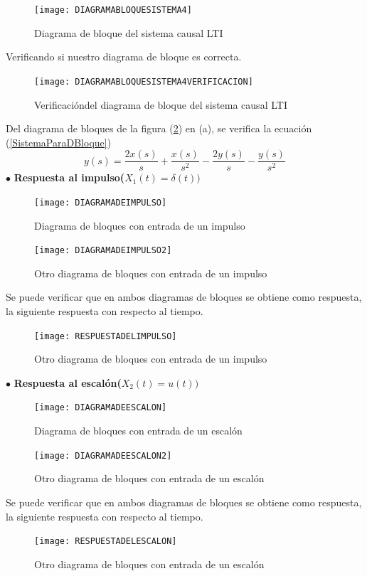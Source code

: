 \documentclass[11pt,a4paper]{article}
\begin{document}
{{\begin{enumerate}
	\begin{figure}[h]
	\centering
	\texttt{[image: DIAGRAMABLOQUESISTEMA4]} 
	\caption{Diagrama de bloque del sistema causal LTI}
\label{DIAGRAMABLOQUESISTEMA4}
\end{figure}
	
	Verificando si nuestro diagrama de bloque es correcta.
	\begin{figure}[h]
	\centering
	\texttt{[image: DIAGRAMABLOQUESISTEMA4VERIFICACION]} 
	\caption{Verificacióndel diagrama de bloque del sistema causal LTI}
\label{DIAGRAMABLOQUESISTEMA4VERIFICACION}
\end{figure}
	Del diagrama de bloques de la figura (\ref{DIAGRAMABLOQUESISTEMA4VERIFICACION})
en (a), se verifica la ecuación (\ref{SistemaParaDBloque})\\
	$$y(s)= \dfrac{2x(s)}{s}+ \dfrac{x(s)}{s^2}- \dfrac{2y(s)}{s}- \dfrac{y(s)}{s^2}$$
	\newpage
 	$\bullet$ \textbf{Respuesta al impulso($X_1(t)=\delta (t))$}\\
	
	\begin{figure}[h]
	\centering
	\texttt{[image: DIAGRAMADEIMPULSO]} 
	\caption{Diagrama de bloques con entrada de un impulso}
\label{DIAGRAMADEIMPULSO}
\end{figure}
\begin{figure}[h]
	\centering
	\texttt{[image: DIAGRAMADEIMPULSO2]} 
	\caption{Otro diagrama de bloques con entrada de un impulso}
\label{DIAGRAMADEIMPULSO2}
\end{figure}
	Se puede verificar que en ambos diagramas de bloques se obtiene como respuesta, la siguiente respuesta con respecto al tiempo.
	\begin{figure}[h]
	\centering
	\texttt{[image: RESPUESTADELIMPULSO]} 
	\caption{Otro diagrama de bloques con entrada de un impulso}
\label{RESPUESTADELIMPULSO}
\end{figure}
	\newpage
	
	$\bullet$ \textbf{Respuesta al escalón($X_2(t)= u(t))$}\\
	
	\begin{figure}[h]
	\centering
	\texttt{[image: DIAGRAMADEESCALON]} 
	\caption{Diagrama de bloques con entrada de un escalón}
\label{DIAGRAMADEESCALON}
\end{figure}
\begin{figure}[h]
	\centering
	\texttt{[image: DIAGRAMADEESCALON2]} 
	\caption{Otro diagrama de bloques con entrada de un escalón}
\label{DIAGRAMADEESCALON2}
\end{figure}
	Se puede verificar que en ambos diagramas de bloques se obtiene como respuesta, la siguiente respuesta con respecto al tiempo.
	\begin{figure}[h]
	\centering
	\texttt{[image: RESPUESTADELESCALON]} 
	\caption{Otro diagrama de bloques con entrada de un escalón}
\label{RESPUESTADELESCALON}
\end{figure}
	\newpage
	

\end{enumerate}}}
\end{document}
